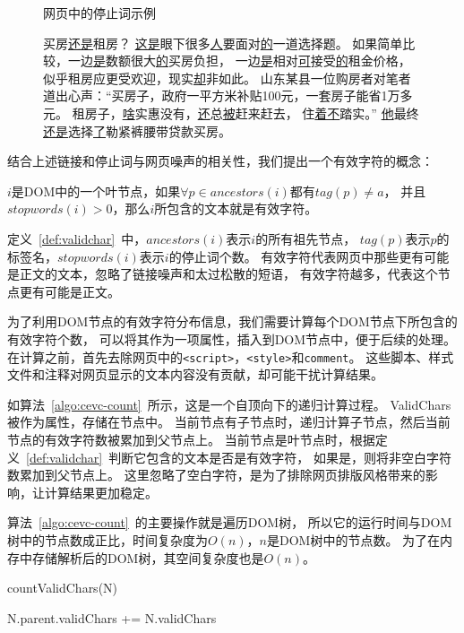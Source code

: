 \begin{figure}[htbp]
\begin{example}
\label{ex:stopwords}
网页中的停止词示例
\end{example}
买房\underline{还是}租房？
\underline{这是}眼下很多\underline{人}要面对\underline{的}一道选择题。
如果简单比较，一边\underline{是}数额很大\underline{的}买房负担，
一边\underline{是}相对\underline{可}接受\underline{的}租金价格，
似乎租房应更受欢迎，现实\underline{却}非如此。
山东某县一位购房者对笔者道出心声：“买房子，政府一平方米补贴100元，一套房子能省1万多元。
租房子，\underline{啥}实惠没有，\underline{还}总\underline{被}赶来赶去，
住\underline{着不}踏实。”
\underline{他}最终\underline{还是}选择\underline{了}勒紧裤腰带贷款买房。
\end{figure}

结合上述链接和停止词与网页噪声的相关性，我们提出一个有效字符的概念：

\begin{definition}
\label{def:validchar}
$i$是DOM中的一个叶节点，如果$\forall p \in ancestors(i)$都有$tag(p) \neq a$，
并且$stopwords(i) > 0$，那么$i$所包含的文本就是有效字符。
\end{definition}

定义~\ref{def:validchar}~中，$ancestors(i)$表示$i$的所有祖先节点，
$tag(p)$表示$p$的标签名，$stopwords(i)$表示$i$的停止词个数。
有效字符代表网页中那些更有可能是正文的文本，忽略了链接噪声和太过松散的短语，
有效字符越多，代表这个节点更有可能是正文。

为了利用DOM节点的有效字符分布信息，我们需要计算每个DOM节点下所包含的有效字符个数，
可以将其作为一项属性，插入到DOM节点中，便于后续的处理。
在计算之前，首先去除网页中的\texttt{<script>}，\texttt{<style>}和\texttt{comment}。
这些脚本、样式文件和注释对网页显示的文本内容没有贡献，却可能干扰计算结果。

如算法~\ref{algo:cevc-count}~所示，这是一个自顶向下的递归计算过程。
ValidChars被作为属性，存储在节点中。
当前节点有子节点时，递归计算子节点，然后当前节点的有效字符数被累加到父节点上。
当前节点是叶节点时，根据定义~\ref{def:validchar}~判断它包含的文本是否是有效字符，
如果是，则将非空白字符数累加到父节点上。
这里忽略了空白字符，是为了排除网页排版风格带来的影响，让计算结果更加稳定。

算法~\ref{algo:cevc-count}~的主要操作就是遍历DOM树，
所以它的运行时间与DOM树中的节点数成正比，时间复杂度为$O(n)$，$n$是DOM树中的节点数。
为了在内存中存储解析后的DOM树，其空间复杂度也是$O(n)$。

\begin{algorithm}[htbp]
\caption{countValidChars(N)}
\label{algo:cevc-count}

 {
  N.parent.validChars += N.validChars \;
}{
}
\end{algorithm}

